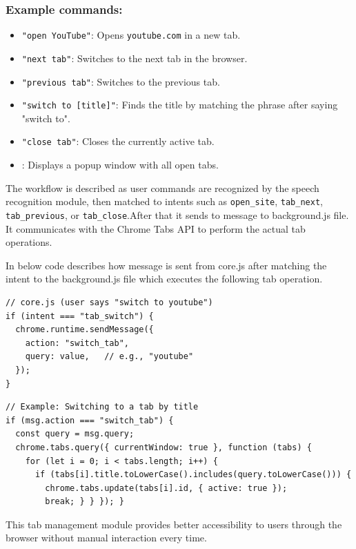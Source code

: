 \subsubsection*{Example commands:}
\begin{itemize}
    \item \texttt{"open YouTube"}: Opens \texttt{youtube.com} in a new tab.
    \item \texttt{"next tab"}: Switches to the next tab in the browser.
    \item \texttt{"previous tab"}: Switches to the previous tab.
    \item \texttt{"switch to [title]"}: Finds the title by matching the phrase after saying "switch to". 
    \item \texttt{"close tab"}: Closes the currently active tab.
    \item  {}: Displays a popup window with all open tabs.
\end{itemize}

The workflow is described as user commands are recognized by the speech recognition module, then matched to intents such as \texttt{open\_site}, \texttt{tab\_next}, \texttt{tab\_previous}, or \texttt{tab\_close}.After that it sends to message to background.js file. It communicates with the Chrome Tabs API to perform the actual tab operations.

In below code describes how message is sent from core.js after matching the intent to the background.js file which executes the following tab operation.

\begin{verbatim}
// core.js (user says "switch to youtube")
if (intent === "tab_switch") {
  chrome.runtime.sendMessage({
    action: "switch_tab",
    query: value,   // e.g., "youtube"
  });
}
\end{verbatim}

\begin{verbatim}
// Example: Switching to a tab by title
if (msg.action === "switch_tab") {
  const query = msg.query;
  chrome.tabs.query({ currentWindow: true }, function (tabs) {
    for (let i = 0; i < tabs.length; i++) {
      if (tabs[i].title.toLowerCase().includes(query.toLowerCase())) {
        chrome.tabs.update(tabs[i].id, { active: true });
        break; } } }); }
\end{verbatim}

This tab management module provides better accessibility to users  through the browser without manual interaction every time.

